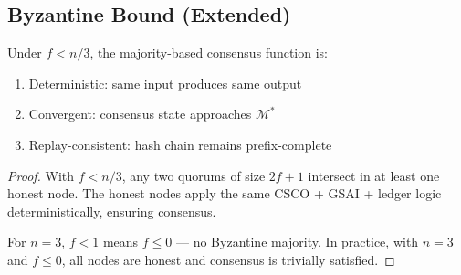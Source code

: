 \subsection{Byzantine Bound (Extended)}

\begin{theorem}
Under $f < n/3$, the majority-based consensus function is:
\begin{enumerate}
    \item Deterministic: same input produces same output
    \item Convergent: consensus state approaches $\mathcal{M}^*$
    \item Replay-consistent: hash chain remains prefix-complete
\end{enumerate}
\end{theorem}

\begin{proof}
With $f < n/3$, any two quorums of size $2f+1$ intersect in at least one
honest node. The honest nodes apply the same CSCO + GSAI + ledger
logic deterministically, ensuring consensus.

For $n = 3$, $f < 1$ means $f \leq 0$ --- no Byzantine majority.
In practice, with $n=3$ and $f \leq 0$, all nodes are honest and consensus
is trivially satisfied.
\end{proof}
